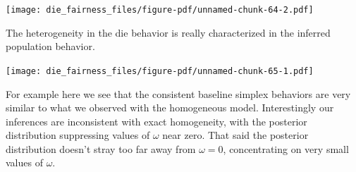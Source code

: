 \documentclass[
  letterpaper,
  DIV=11,
  numbers=noendperiod]{scrartcl}
\newenvironment{Shaded}{\begin{snugshade}}{\end{snugshade}}
\newcommand{\AttributeTok}[1]{\textcolor[rgb]{0.40,0.45,0.13}{#1}}
\newcommand{\ControlFlowTok}[1]{\textcolor[rgb]{0.00,0.23,0.31}{#1}}
\newcommand{\DecValTok}[1]{\textcolor[rgb]{0.68,0.00,0.00}{#1}}
\newcommand{\FloatTok}[1]{\textcolor[rgb]{0.68,0.00,0.00}{#1}}
\newcommand{\FunctionTok}[1]{\textcolor[rgb]{0.28,0.35,0.67}{#1}}
\newcommand{\NormalTok}[1]{\textcolor[rgb]{0.00,0.23,0.31}{#1}}
\newcommand{\OtherTok}[1]{\textcolor[rgb]{0.00,0.23,0.31}{#1}}
\newcommand{\SpecialCharTok}[1]{\textcolor[rgb]{0.37,0.37,0.37}{#1}}
\newcommand{\StringTok}[1]{\textcolor[rgb]{0.13,0.47,0.30}{#1}}
\begin{document}
\texttt{[image: die\_fairness\_files/figure-pdf/unnamed-chunk-64-2.pdf]}

The heterogeneity in the die behavior is really characterized in the
inferred population behavior.

\begin{Shaded}
\end{Shaded}

\texttt{[image: die\_fairness\_files/figure-pdf/unnamed-chunk-65-1.pdf]}

For example here we see that the consistent baseline simplex behaviors
are very similar to what we observed with the homogeneous model.
Interestingly our inferences are inconsistent with exact homogeneity,
with the posterior distribution suppressing values of \(\omega\) near
zero. That said the posterior distribution doesn't stray too far away
from \(\omega = 0\), concentrating on very small values of \(\omega\).
\end{document}
